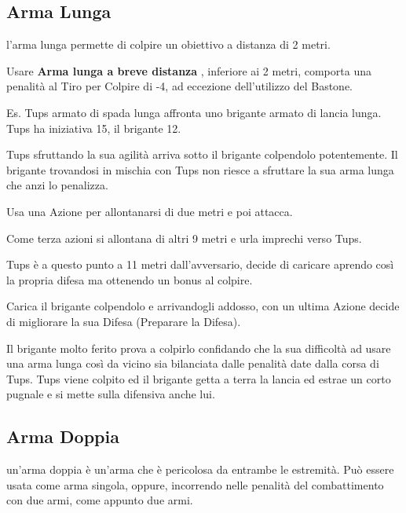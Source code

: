 \begin{multicols}{2}
%
\subsection{Arma Lunga} \label{armalunga}

l'arma lunga permette di colpire un obiettivo a distanza di 2 metri.

Usare \textbf{Arma lunga a breve distanza} \label{armalungabrevedistanza}, inferiore ai 2 metri, comporta una penalità al Tiro per Colpire di -4, ad eccezione dell'utilizzo del Bastone.

\begin{giocatore}
		Es. Tups armato di spada lunga affronta uno brigante armato di lancia lunga. Tups ha iniziativa 15, il brigante 12.

		Tups sfruttando la sua agilità arriva sotto il brigante colpendolo potentemente. Il brigante trovandosi in mischia con Tups non riesce a sfruttare la sua arma lunga che anzi lo penalizza.

		Usa una Azione per allontanarsi di due metri e poi attacca.

		Come terza azioni si allontana di altri 9 metri e urla imprechi verso Tups.

		Tups è a questo punto a 11 metri dall'avversario, decide di caricare aprendo così la propria difesa ma ottenendo un bonus al colpire.

		Carica il brigante colpendolo e arrivandogli addosso, con un ultima Azione decide di migliorare la sua Difesa (Preparare la Difesa).

		Il brigante molto ferito prova a colpirlo confidando che la sua difficoltà ad usare una arma lunga così da vicino sia bilanciata dalle penalità date dalla corsa di Tups. Tups viene colpito ed il brigante getta a terra la lancia ed estrae un corto pugnale e si mette sulla difensiva anche lui.

\end{giocatore}

\subsection{Arma Doppia} \label{armadippia}

un'arma doppia è un'arma che è pericolosa da entrambe le estremità. Può essere usata come arma singola, oppure, incorrendo nelle penalità del combattimento con due armi, come appunto due armi.


\end{multicols}
